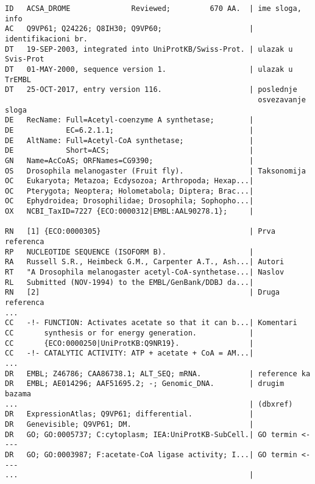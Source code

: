\begin{lstlisting}
ID   ACSA_DROME              Reviewed;         670 AA.  | ime sloga, info
AC   Q9VP61; Q24226; Q8IH30; Q9VP60;                    | identifikacioni br.
DT   19-SEP-2003, integrated into UniProtKB/Swiss-Prot. | ulazak u Svis-Prot
DT   01-MAY-2000, sequence version 1.                   | ulazak u TrEMBL
DT   25-OCT-2017, entry version 116.                    | poslednje 
                                                          osvezavanje sloga
DE   RecName: Full=Acetyl-coenzyme A synthetase;        |
DE            EC=6.2.1.1;                               |
DE   AltName: Full=Acetyl-CoA synthetase;               |
DE            Short=ACS;                                |
GN   Name=AcCoAS; ORFNames=CG9390;                      |
OS   Drosophila melanogaster (Fruit fly).               | Taksonomija
OC   Eukaryota; Metazoa; Ecdysozoa; Arthropoda; Hexap...|
OC   Pterygota; Neoptera; Holometabola; Diptera; Brac...|
OC   Ephydroidea; Drosophilidae; Drosophila; Sophopho...|
OX   NCBI_TaxID=7227 {ECO:0000312|EMBL:AAL90278.1};     |
                                                        
RN   [1] {ECO:0000305}                                  | Prva referenca
RP   NUCLEOTIDE SEQUENCE (ISOFORM B).                   | 
RA   Russell S.R., Heimbeck G.M., Carpenter A.T., Ash...| Autori
RT   "A Drosophila melanogaster acetyl-CoA-synthetase...| Naslov
RL   Submitted (NOV-1994) to the EMBL/GenBank/DDBJ da...|
RN   [2]                                                | Druga referenca              
...                                                     
CC   -!- FUNCTION: Activates acetate so that it can b...| Komentari
CC       synthesis or for energy generation.            |
CC       {ECO:0000250|UniProtKB:Q9NR19}.                |
CC   -!- CATALYTIC ACTIVITY: ATP + acetate + CoA = AM...|
...                                                     
DR   EMBL; Z46786; CAA86738.1; ALT_SEQ; mRNA.           | reference ka
DR   EMBL; AE014296; AAF51695.2; -; Genomic_DNA.        | drugim bazama 
...                                                     | (dbxref)
DR   ExpressionAtlas; Q9VP61; differential.             |
DR   Genevisible; Q9VP61; DM.                           |
DR   GO; GO:0005737; C:cytoplasm; IEA:UniProtKB-SubCell.| GO termin <----
DR   GO; GO:0003987; F:acetate-CoA ligase activity; I...| GO termin <----
...                                                     |


\end{lstlisting}

